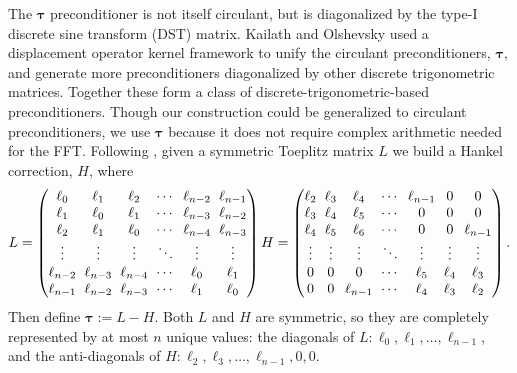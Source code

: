 \documentclass[review]{siamart251216}
\newcommand{\Hank}{{ H }}
\newcommand{\Toe}{{ L }}
\newcommand{\toe}{{ \ell }}
\newcommand{\ptau}{{\bm{\tau}}}
\begin{document}
The $\ptau$ preconditioner is not itself circulant, but is diagonalized by the type-I discrete sine transform (DST) matrix. Kailath and Olshevsky used a displacement operator kernel framework to unify the circulant preconditioners, $\ptau$, and generate more preconditioners diagonalized by other discrete trigonometric matrices. Together these form a class of discrete-trigonometric-based preconditioners. Though our construction could be generalized to circulant preconditioners, we use $\ptau$ because it does not require complex arithmetic needed for the FFT. Following \cite{Bini}, given a symmetric Toeplitz matrix $\Toe$ we build a Hankel correction, $H$, where 
\begin{equation} \label{Hank}
	\Toe = 
	\begingroup %
	\setlength\arraycolsep{3pt}
	\begin{pmatrix}
		\toe_0 & \toe_1 & \toe_2 & \cdots &\toe_{n-2}& \toe_{n-1} \\
		\toe_1 & \toe_0 & \toe_1 &  \cdots &\toe_{n-3}& \toe_{n-2} \\
		\toe_2 & \toe_1 & \toe_0 & \cdots &\toe_{n-4}& \toe_{n-3} \\
		\vdots & \vdots & \vdots & \ddots&\vdots & \vdots \\
		\toe_{n-2} & \toe_{n-3}   & \toe_{n-4} & \cdots &\toe_0 & \toe_1 \\
		\toe_{n-1} & \toe_{n-2}    & \toe_{n-3} & \cdots & \toe_1 & \toe_0 
	\end{pmatrix}
	\Hank = \begin{pmatrix}
		\toe_2 & \toe_3 & \toe_4 & \cdots & \toe_{n-1} & 0 & 0 \\
		\toe_3 & \toe_4 & \toe_5 & \cdots  & 0 & 0 & 0 \\
		\toe_4 & \toe_5 & \toe_6 & \cdots & 0 & 0 & \toe_{n-1} \\
		\vdots & \vdots & \vdots & \ddots & \vdots & \vdots & \vdots \\
		0 & 0 & 0 & \cdots & \toe_5 & \toe_4 & \toe_3 \\
		0 & 0 & \toe_{n-1} & \cdots & \toe_4 & \toe_3 & \toe_2
	\end{pmatrix}.
	\endgroup
\end{equation}
Then define $\ptau := \Toe - H$. Both $\Toe$ and $\Hank$ are symmetric, so they are completely represented by at most $n$ unique values: the diagonals of $\Toe: \toe_0, \toe_1, \dots, \toe_{n-1}$, and the anti-diagonals of $\Hank: \toe_2, \toe_3, \dots, \toe_{n-1},0,0 $. 
	
\end{document}
